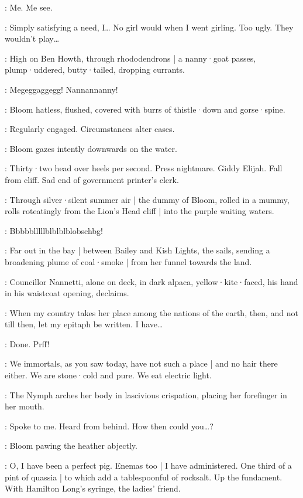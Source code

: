 \StaggeringBob:
Me. Me see.

\Bloom:
Simply satisfying a need,
I…
No girl would when I went girling.
Too ugly.
They wouldn't play…

:
High on Ben Howth,
through rhododendrons |
a nanny·goat passes,
plump·uddered,
butty·tailed,
dropping currants.

\Nannygoat:
Megeggaggegg!
Nannannanny!

:
Bloom hatless,
flushed,
covered with burrs of thistle·down and gorse·spine.

\Bloom:
Regularly engaged.
Circumstances alter cases.

:
Bloom gazes intently downwards on the water.

\Bloom:
Thirty·two head over heels per second.
Press nightmare.
Giddy Elijah.
Fall from cliff.
Sad end of government printer's clerk.

:
Through silver·silent summer air |
the dummy of Bloom,
rolled in a mummy,
rolls roteatingly from the Lion's Head cliff |
into the purple waiting waters.

\Dummymummy:
Bbbbblllllblblblblobschbg!

:
Far out in the bay |
between Bailey and Kish Lights,
the  sails,
sending a broadening plume of coal·smoke |
from her funnel towards the land.

:
Councillor Nannetti,
alone on deck,
in dark alpaca,
yellow·kite·faced,
his hand in his waistcoat opening,
declaims.

\CouncillorNannetti:
When my country takes her place among the nations of the earth,
then,
and not till then,
let my epitaph be written.
I have…

\Bloom:
Done.
Prff!

\Nymph:
We immortals,
as you saw today,
have not such a place |
and no hair there either.
We are stone·cold and pure.
We eat electric light.

:
The Nymph arches her body in lascivious crispation,
placing her forefinger in her mouth.

\Nymph:
Spoke to me.
Heard from behind.
How then could you…?

:
Bloom pawing the heather abjectly.

\Bloom:
O,
I have been a perfect pig.
Enemas too |
I have administered.
One third of a pint of quassia |
to which add a tablespoonful of rocksalt.
Up the fundament.
With Hamilton Long's syringe,
the ladies' friend.%

